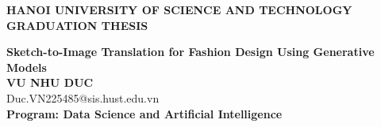 \documentclass[Main.tex]{subfiles}
\begin{document}
\begin{titlepage}
\thispagestyle{empty}
\begin{center}

{\textbf{\large{HANOI UNIVERSITY OF SCIENCE AND TECHNOLOGY }}}\\[4cm]

{\textbf{\huge{GRADUATION THESIS}}}\\[1cm]
{\textbf{\Large{Sketch-to-Image Translation for Fashion Design Using Generative Models}}\\[1cm]

{\textbf{\large{VU NHU DUC}}}\\
{\large{Duc.VN225485@sis.hust.edu.vn}}\\[0.5cm]

{\textbf{\large{Program: Data Science and Artificial Intelligence}}}\\

\vspace{4cm}
\begin{table}[H]
\centering
{}
\end{table}}
\end{center}



\end{titlepage}
\end{document}
